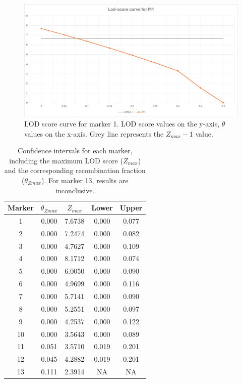 \documentclass[a4paper,12pt]{article}
\begin{document}
\begin{figure}[ht!] %
    \centering
    \includegraphics[width=\textwidth]{images/LOD-score_curve_M1.png}
    \caption{LOD score curve for marker 1. LOD score values on the y-axis, $\theta$ values on the x-axis. 
    Grey line represents the $\mathit{Z_{max}-1}$ value.}  
    \label{fig:lod_curve} 
    
\end{figure}

\begin{table}[ht!]
    \centering
    \begin{tabular}{ccccc}
        \toprule
        \textbf{Marker} & \textbf{$\mathit{\theta_{Zmax}}$} & \textbf{$\mathit{Z_{max}}$} & \textbf{Lower} & \textbf{Upper} \\ 
        \midrule
        1 & 0.000 & 7.6738 & 0.000 & 0.077 \\ 
        2 & 0.000 & 7.2474 & 0.000 & 0.082 \\ 
        3 & 0.000 & 4.7627 & 0.000 & 0.109 \\ 
        4 & 0.000 & 8.1712 & 0.000 & 0.074 \\ 
        5 & 0.000 & 6.0050 & 0.000 & 0.090 \\ 
        6 & 0.000 & 4.9699 & 0.000 & 0.116 \\ 
        7 & 0.000 & 5.7141 & 0.000 & 0.090 \\ 
        8 & 0.000 & 5.2551 & 0.000 & 0.097 \\ 
        9 & 0.000 & 4.2537 & 0.000 & 0.122 \\ 
        10 & 0.000 & 3.5643 & 0.000 & 0.089 \\ 
        11 & 0.051 & 3.5710 & 0.019 & 0.201 \\ 
        12 & 0.045 & 4.2882 & 0.019 & 0.201 \\ 
        13 & 0.111 & 2.3914 & NA & NA \\ 
        \bottomrule
    \end{tabular}
    \caption{Confidence intervals for each marker, including the maximum LOD score ($\mathit{Z_{max}}$) 
    and the corresponding recombination fraction ($\mathit{\theta_{Zmax}}$). For marker 13, results are inconclusive.}
    \label{tab:ci_bounds}
\end{table}
\end{document}
